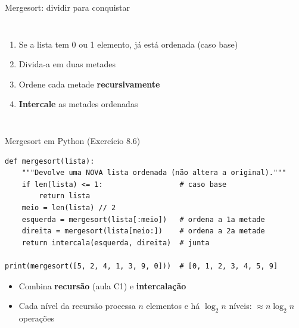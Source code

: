 \documentclass[aspectratio=169,10pt,t]{beamer}
\begin{document}
\begin{frame}{Mergesort: dividir para conquistar}
  \begin{columns}[T]
    \begin{enumerate}
      \item Se a lista tem 0 ou 1 elemento, já está ordenada (\alert{caso base})
      \item Divida-a em duas metades
      \item Ordene cada metade \textbf{recursivamente}
      \item \textbf{Intercale} as metades ordenadas
    \end{enumerate}
  \end{columns}
\end{frame}

\begin{frame}[fragile]{Mergesort em Python (Exercício 8.6)}
\begin{lstlisting}
def mergesort(lista):
    """Devolve uma NOVA lista ordenada (não altera a original)."""
    if len(lista) <= 1:                  # caso base
        return lista
    meio = len(lista) // 2
    esquerda = mergesort(lista[:meio])   # ordena a 1a metade
    direita = mergesort(lista[meio:])    # ordena a 2a metade
    return intercala(esquerda, direita)  # junta

print(mergesort([5, 2, 4, 1, 3, 9, 0]))  # [0, 1, 2, 3, 4, 5, 9]
\end{lstlisting}
  \begin{itemize}
    \item Combina \textbf{recursão} (aula C1) e \textbf{intercalação}
    \item Cada nível da recursão processa \(n\) elementos e há \(\log_2 n\) níveis: \(\approx n\log_2 n\) operações
  \end{itemize}
\end{frame}
\end{document}
